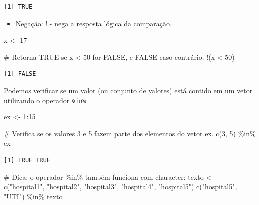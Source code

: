 \documentclass[
  letterpaper,
  DIV=11,
  numbers=noendperiod]{scrreprt}
\newenvironment{Shaded}{\begin{snugshade}}{\end{snugshade}}
\newcommand{\CommentTok}[1]{\textcolor[rgb]{0.37,0.37,0.37}{#1}}
\newcommand{\DecValTok}[1]{\textcolor[rgb]{0.68,0.00,0.00}{#1}}
\newcommand{\FunctionTok}[1]{\textcolor[rgb]{0.28,0.35,0.67}{#1}}
\newcommand{\NormalTok}[1]{\textcolor[rgb]{0.00,0.23,0.31}{#1}}
\newcommand{\OtherTok}[1]{\textcolor[rgb]{0.00,0.23,0.31}{#1}}
\newcommand{\SpecialCharTok}[1]{\textcolor[rgb]{0.37,0.37,0.37}{#1}}
\newcommand{\StringTok}[1]{\textcolor[rgb]{0.13,0.47,0.30}{#1}}
\providecommand{\tightlist}{%
  \setlength{\itemsep}{0pt}\setlength{\parskip}{0pt}}\usepackage{longtable,booktabs,array}
\begin{document}
\begin{verbatim}
[1] TRUE
\end{verbatim}

\begin{itemize}
\tightlist
\item
  Negação: ! - nega a resposta lógica da comparação.
\end{itemize}

\begin{Shaded}
\begin{Highlighting}[]
\NormalTok{x }\OtherTok{\textless{}{-}} \DecValTok{17}

\CommentTok{\# Retorna TRUE se x \textless{} 50 for FALSE, e FALSE caso contrário. }
\SpecialCharTok{!}\NormalTok{(x }\SpecialCharTok{\textless{}} \DecValTok{50}\NormalTok{)}
\end{Highlighting}
\end{Shaded}

\begin{verbatim}
[1] FALSE
\end{verbatim}

Podemos verificar se um valor (ou conjunto de valores) está contido em
um vetor utilizando o operador \texttt{\%in\%}.

\begin{Shaded}
\begin{Highlighting}[]
\NormalTok{ex }\OtherTok{\textless{}{-}} \DecValTok{1}\SpecialCharTok{:}\DecValTok{15}

\CommentTok{\# Verifica se os valores 3 e 5 fazem parte dos elementos do vetor ex.}
\FunctionTok{c}\NormalTok{(}\DecValTok{3}\NormalTok{, }\DecValTok{5}\NormalTok{) }\SpecialCharTok{\%in\%}\NormalTok{ ex}
\end{Highlighting}
\end{Shaded}

\begin{verbatim}
[1] TRUE TRUE
\end{verbatim}

\begin{Shaded}
\begin{Highlighting}[]
\CommentTok{\# Dica: o operador \%in\% também funciona com character:}
\NormalTok{texto }\OtherTok{\textless{}{-}} \FunctionTok{c}\NormalTok{(}\StringTok{"hospital1"}\NormalTok{, }\StringTok{"hospital2"}\NormalTok{, }\StringTok{"hospital3"}\NormalTok{, }\StringTok{"hospital4"}\NormalTok{, }\StringTok{"hospital5"}\NormalTok{)}
\FunctionTok{c}\NormalTok{(}\StringTok{"hospital5"}\NormalTok{, }\StringTok{"UTI"}\NormalTok{) }\SpecialCharTok{\%in\%}\NormalTok{ texto}
\end{Highlighting}
\end{Shaded}
\end{document}
